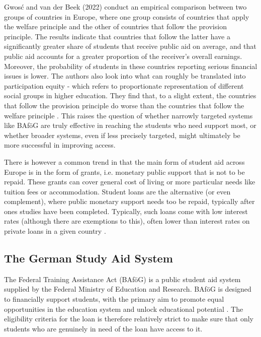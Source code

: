 Gwosć and van der Beek (2022) conduct an empirical comparison between two groups of countries in Europe, where one group consists of countries that apply the welfare principle and the other of countries that follow the provision principle. The results indicate that countries that follow the latter have a significantly greater share of students that receive public aid on average, and that public aid accounts for a greater proportion of the receiver’s overall earnings. Moreover, the probability of students in these countries reporting serious financial issues is lower. The authors also look into what can roughly be translated into participation equity - which refers to proportionate representation of different social groups in higher education. They find that, to a slight extent, the countries that follow the provision principle do worse than the countries that follow the welfare principle \citep{gwosc_krisenbewaltigung_2022}. This raises the question of whether narrowly targeted systems like BAföG are truly effective in reaching the students who need support most, or whether broader systems, even if less precisely targeted, might ultimately be more successful in improving access.

There is however a common trend in that the main form of student aid across Europe is in the form of grants, i.e. monetary public support that is not to be repaid. These grants can cover general cost of living or more particular needs like tuition fees or accommodation. Student loans are the alternative (or even complement), where public monetary support needs too be repaid, typically after ones studies have been completed. Typically, such loans come with low interest rates (although there are exemptions to this), often lower than interest rates on private loans in a given country \citep{schwarz_study_2004}.


%
%
\subsection{The German Study Aid System} 
\label{section:the-german-study-aid-system}

The Federal Training Assistance Act (BAföG) is a public student aid system supplied by the Federal Ministry of Education and Research. BAföG is designed to financially support students, with the primary aim to promote equal opportunities in the education system and unlock educational potential \citep{meier_bafog_2024}. The eligibility criteria for the loan is therefore relatively strict to make sure that only students who are genuinely in need of the loan have access to it.


